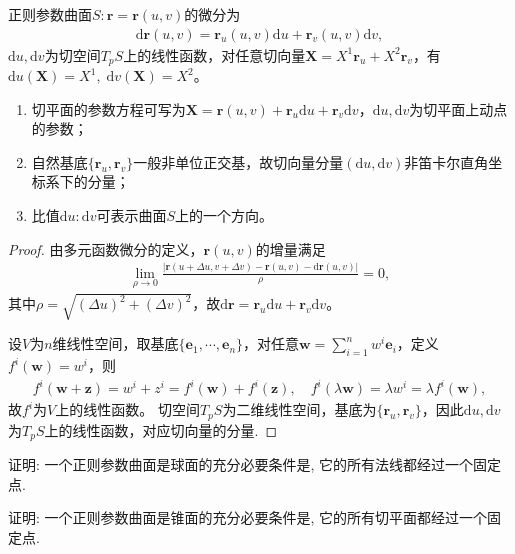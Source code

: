 \documentclass[../../main.tex]{subfiles}%
\begin{document}
\begin{proposition}
正则参数曲面$S:\bm r=\bm r(u,v)$的微分为
\begin{align}
\mathrm{d}\bm r(u,v)=\bm r_u(u,v)\mathrm{d}u+\bm r_v(u,v)\mathrm{d}v,
\label{eq:surfdiff}
\end{align}
$\mathrm{d}u,\mathrm{d}v$为切空间$T_pS$上的线性函数，对任意切向量$\bm X=X^1\bm r_u+X^2\bm r_v$，有$\mathrm{d}u(\bm X)=X^1,\;\mathrm{d}v(\bm X)=X^2$。
\end{proposition}
\begin{remark}
\begin{enumerate}[(1)]
\item 切平面的参数方程可写为$\bm X=\bm r(u,v)+\bm r_u\mathrm{d}u+\bm r_v\mathrm{d}v$，$\mathrm{d}u,\mathrm{d}v$为切平面上动点的参数；
\item 自然基底$\{\bm r_u,\bm r_v\}$一般非单位正交基，故切向量分量$(\mathrm{d}u,\mathrm{d}v)$非笛卡尔直角坐标系下的分量；
\item 比值$\mathrm{d}u:\mathrm{d}v$可表示曲面$S$上的一个方向。
\end{enumerate}
\end{remark}
\begin{proof}
由多元函数微分的定义，$\bm r(u,v)$的增量满足
\begin{align*}
\lim\limits_{\rho\to0}\frac{|\bm r(u+\Delta u,v+\Delta v)-\bm r(u,v)-\mathrm{d}\bm r(u,v)|}{\rho}=0,
\end{align*}
其中$\rho=\sqrt{(\Delta u)^2+(\Delta v)^2}$，故$\mathrm{d}\bm r=\bm r_u\mathrm{d}u+\bm r_v\mathrm{d}v$。

设$V$为$n$维线性空间，取基底$\{\bm e_1,\cdots,\bm e_n\}$，对任意$\bm w=\sum\limits_{i=1}^nw^i\bm e_i$，定义$f^i(\bm w)=w^i$，则
\begin{align*}
f^i(\bm w+\bm z)=w^i+z^i=f^i(\bm w)+f^i(\bm z),\quad f^i(\lambda\bm w)=\lambda w^i=\lambda f^i(\bm w),
\end{align*}
故$f^i$为$V$上的线性函数。
切空间$T_pS$为二维线性空间，基底为$\{\bm r_u,\bm r_v\}$，因此$\mathrm{d}u,\mathrm{d}v$为$T_pS$上的线性函数，对应切向量的分量.
\end{proof}

\begin{example}
证明: 一个正则参数曲面是球面的充分必要条件是, 它的所有法线都经过一个固定点.
\end{example}

\begin{example}
证明: 一个正则参数曲面是锥面的充分必要条件是, 它的所有切平面都经过一个固定点.
\end{example}
\end{document}
